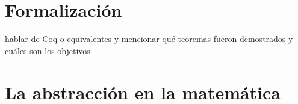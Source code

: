 






\section*{Formalización}

hablar de Coq o equivalentes y mencionar qué teoremas fueron demostrados y cuáles son los objetivos

\section*{La abstracción en la matemática}

